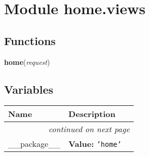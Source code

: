 %
%
%


\section{Module home.views}

    \label{home:views}


  \subsection{Functions}

    \label{home:views:home}

    \vspace{0.5ex}

\hspace{.8\funcindent}\begin{boxedminipage}{\funcwidth}

    \raggedright \textbf{home}(\textit{request})

\setlength{\parskip}{2ex}
\setlength{\parskip}{1ex}
    \end{boxedminipage}



  \subsection{Variables}

    \vspace{-1cm}
\hspace{\varindent}\begin{longtable}{|p{\varnamewidth}|p{\vardescrwidth}|l}
\cline{1-2}
\cline{1-2} \centering \textbf{Name} & \centering \textbf{Description}& \\
\cline{1-2}
\endhead\cline{1-2}\multicolumn{3}{r}{\small\textit{continued on next page}}\\\endfoot\cline{1-2}
\endlastfoot\raggedright \_\-\_\-p\-a\-c\-k\-a\-g\-e\-\_\-\_\- & \raggedright \textbf{Value:} 
{\tt \texttt{'}\texttt{home}\texttt{'}}&\\
\cline{1-2}
\end{longtable}


